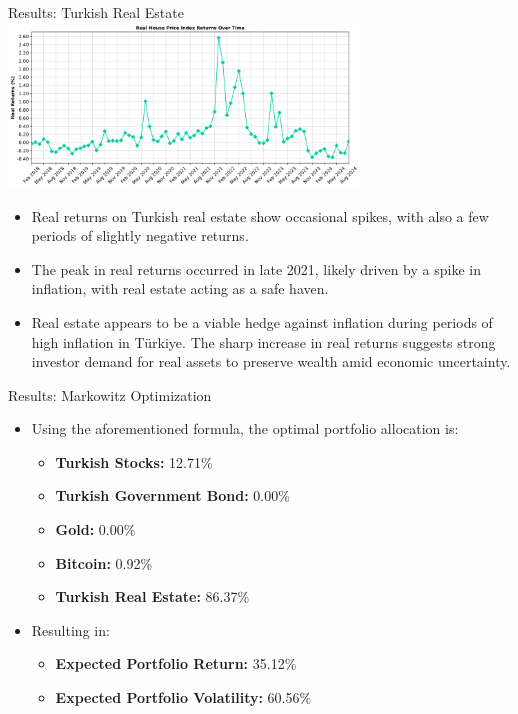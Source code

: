 \documentclass{beamer}
\begin{document}
\begin{frame}{Results: Turkish Real Estate}
\includegraphics[width=0.7\textwidth]{real_hpi_returns.png}
\begin{itemize}
\item Real returns on Turkish real estate show occasional spikes, with also a few periods of slightly negative returns.
\item The peak in real returns occurred in late 2021, likely driven by a spike in inflation, with real estate acting as a safe haven.
\item Real estate appears to be a viable hedge against inflation during periods of high inflation in Türkiye. The sharp increase in real returns suggests strong investor demand for real assets to preserve wealth amid economic uncertainty.
\end{itemize}
\end{frame}

\begin{frame}{Results: Markowitz Optimization}
\begin{itemize}
    \item Using the aforementioned formula, the optimal portfolio allocation is:
    \begin{itemize}
        \item \textbf{Turkish Stocks:} 12.71\%
        \item \textbf{Turkish Government Bond:} 0.00\%
        \item \textbf{Gold:} 0.00\%
        \item \textbf{Bitcoin:} 0.92\%
        \item \textbf{Turkish Real Estate:} 86.37\%
    \end{itemize}
    \item Resulting in:
    \begin{itemize}
        \item \textbf{Expected Portfolio Return:} 35.12\%
        \item \textbf{Expected Portfolio Volatility:} 60.56\%
    \end{itemize}
\end{itemize}
\end{frame}
\end{document}
